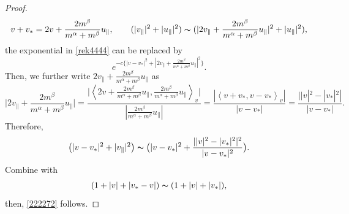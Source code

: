 \documentclass[reqno]{amsart}
\numberwithin{equation}{section}
\numberwithin{equation}{section}
\begin{document}
\begin{proof}
\begin{equation*}
		v+v_*=2v+\frac{2m^{\beta}}{m^{\alpha}+m^{\beta}}u_{\parallel}, \qquad  (|v_{\parallel}|^2+|u_{\parallel}|^2) \thicksim (|2v_{\parallel}+\frac{2m^{\beta}}{m^{\alpha}+m^{\beta}}u_{\parallel}|^2+|u_{\parallel}|^2),
	\end{equation*}
	 the exponential in \eqref{rek4444} can be replaced by
	\begin{equation*}
		e^{-c\{|v-v_*|^2+|2v_{\parallel}+\frac{2m^{\beta}}{m^{\alpha}+m^{\beta}}u_{\parallel}|^2\}}.
	\end{equation*}
	Then,  we further write $2v_{\parallel}+\frac{2m^{\beta}}{m^{\alpha}+m^{\beta}}u_{\parallel}$ as
	\begin{equation*}
		\big|2v_{\parallel}+\frac{2m^{\beta}}{m^{\alpha}+m^{\beta}}u_{\parallel}\big|=\frac{\big|\left \langle 2v+\frac{2m^{\beta}}{m^{\alpha}+m^{\beta}}u_{\parallel}, \frac{2m^{\beta}}{m^{\alpha}+m^{\beta}}u_{\parallel} \right \rangle_{v}\big|}{|\frac{2m^{\beta}}{m^{\alpha}+m^{\beta}}u_{\parallel}|}=\frac{|\left \langle v+v_*, v-v_* \right \rangle_{v}|}{|v-v_*|}=\frac{||v|^2-|v_*|^2|}{|v-v_*|}.
	\end{equation*}
	Therefore,
	\begin{equation*}
		\big(|v-v_*|^2+|v_{\parallel}|^2\big) \thicksim \big(|v-v_*|^2+\frac{||v|^2-|v_*|^2|^2}{|v-v_*|^2}\big).
	\end{equation*}
	Combine with
	\begin{equation*}
		(1+|v|+|v_*-v|) \thicksim (1+|v|+|v_*|),
	\end{equation*}
	then, \eqref{222272} follows. 
	

\end{proof}
\end{document}
